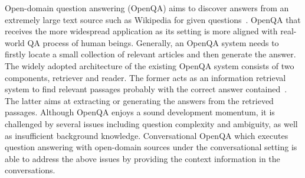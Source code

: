 Open-domain question answering (OpenQA) aims to discover answers from an extremely large text source such as Wikipedia for given questions~\cite{chen2017reading, yang2019end, zhu2021retrieving}. OpenQA that receives the more widespread application as its setting is more aligned with real-world QA process of human beings. Generally, an OpenQA system needs to firstly locate a small collection of relevant articles and then generate the answer. 
The widely adopted architecture of the existing OpenQA system consists of two components, retriever and reader. The former acts as an information retrieval system to find relevant passages probably with the correct answer contained~\cite{kratzwald2018adaptive, lee2019latent,xiong2020answering,min2019knowledge,izacard2021leveraging}. The latter aims at extracting or generating the answers from the retrieved passages.
Although OpenQA enjoys a sound development momentum, it is challenged by several issues including question complexity and ambiguity, as well as insufficient background knowledge.
Conversational OpenQA which executes question answering with open-domain sources under the conversational setting is able to address the above issues by providing the context information in the conversations. 

